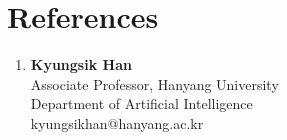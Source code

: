 \documentclass[a4paper,11pt]{article}
\newcommand{\resumeSubHeadingListEnd}{\end{itemize}\vspace{2mm}}
\begin{document}




\section{\textbf{References}}
\begin{enumerate}[leftmargin=*,labelsep=2mm]
\item \textbf{Kyungsik Han}\\
   Associate Professor, Hanyang University\\
   Department of Artificial Intelligence\\
   kyungsikhan@hanyang.ac.kr\\
\end{enumerate}
\end{document}
